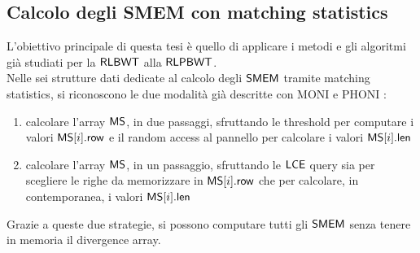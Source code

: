 \subsection{Calcolo degli SMEM con matching statistics}
L'obiettivo principale di questa tesi è quello di applicare i metodi e gli
algoritmi già 
studiati per la $\mbox{\rm {\sf RLBWT}}$ alla $\mbox{\rm {\sf RLPBWT}}$.\\
Nelle sei strutture dati dedicate al calcolo degli $\mbox{\rm {\sf SMEM}}$ tramite matching
statistics, si riconoscono le due modalità già descritte con MONI \cite{moni} e
PHONI \cite{phoni}:
\begin{enumerate}
  \item calcolare l'array $\mbox{\rm {\sf MS}}$, in due passaggi, sfruttando le threshold per
  computare i valori $\mbox{\rm {\sf MS}}[i].\mbox{\rm {\sf row}}$ e il
  random access al pannello per calcolare i valori $\mbox{\rm {\sf MS}}[i].\mbox{\rm {\sf len}}$
  \item calcolare l'array $\mbox{\rm {\sf MS}}$, in un passaggio, sfruttando le $\mbox{\rm {\sf LCE}}$ query
  sia per scegliere le righe da memorizzare in $\mbox{\rm {\sf MS}}[i].\mbox{\rm {\sf row}}$ che per calcolare,
  in contemporanea, i valori $\mbox{\rm {\sf MS}}[i].\mbox{\rm {\sf len}}$ 
\end{enumerate}
Grazie a queste due strategie, si possono computare tutti gli $\mbox{\rm {\sf SMEM}}$ senza
tenere in memoria il divergence array.
